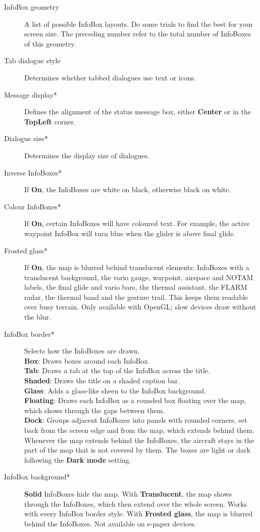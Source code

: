 \begin{description}
\item[InfoBox geometry]  A list of possible InfoBox layouts. Do some trials to find the 
  best for your screen size. The preceding number refer to the total number of 
  InfoBoxes of this geometry.
\item[Tab dialogue style]  Determines whether tabbed dialogues use text or icons.
\item[Message display*]  Defines the alignment of the status message box, either 
  {\bf Center} or in the {\bf TopLeft} corner.
\item[Dialogue size*]  Determines the display size of dialogues.
\item[Inverse InfoBoxes*]  If {\bf On}, the InfoBoxes are white on black, otherwise 
  black on white.
\item[Colour InfoBoxes*]  If {\bf On}, certain InfoBoxes will have coloured text. For 
  example, the active waypoint InfoBox will turn blue when the glider is above final 
  glide.
\item[Frosted glass*]  If {\bf On}, the map is blurred behind translucent
  elements: InfoBoxes with a translucent background, the vario gauge,
  waypoint, airspace and NOTAM labels, the final glide and vario bars,
  the thermal assistant, the FLARM radar, the thermal band and the
  gesture trail. This keeps them readable over busy terrain.
  Only available with OpenGL; slow devices draw without the blur.
\item[InfoBox border*]  Selects how the InfoBoxes are drawn. \\
  {\bf Box}: Draws boxes around each InfoBox. \\
  {\bf Tab}: Draws a tab at the top of the InfoBox across the
  title. \\
  {\bf Shaded}: Draws the title on a shaded caption bar. \\
  {\bf Glass}: Adds a glass-like sheen to the InfoBox background. \\
  {\bf Floating}: Draws each InfoBox as a rounded box floating over
  the map, which shows through the gaps between them. \\
  {\bf Dock}: Groups adjacent InfoBoxes into panels with rounded
  corners, set back from the screen edge and from the map, which
  extends behind them. \\
  Whenever the map extends behind the InfoBoxes, the aircraft stays in
  the part of the map that is not covered by them.  The boxes are
  light or dark following the {\bf Dark mode} setting.
\item[InfoBox background*]  {\bf Solid} InfoBoxes hide the map.
  With {\bf Translucent}, the map shows through the InfoBoxes, which
  then extend over the whole screen.  Works with every InfoBox border
  style.  With {\bf Frosted glass}, the map is blurred behind the
  InfoBoxes.  Not available on e-paper devices.
\end{description}



